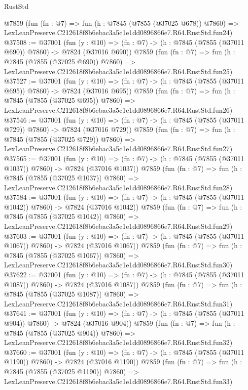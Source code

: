 \begin{lexlean}{RustStd}
\begin{coremodule}
    @7859
    (fun (fn : @7) =>
    fun (h : @7845 (@7855 (@37025 @678)) @7860) =>
    LexLeanPreserve.C212618f8b6ebac3a5c1e1dd0896866e7.R64.RustStd.fun24)
@37508 := @37001
    (fun (y : @10) => (fn : @7) -> (h : @7845 (@7855 (@37011 @690)) @7860) -> @7824 (@37016 @690))
    @7859
    (fun (fn : @7) =>
    fun (h : @7845 (@7855 (@37025 @690)) @7860) =>
    LexLeanPreserve.C212618f8b6ebac3a5c1e1dd0896866e7.R64.RustStd.fun25)
@37527 := @37001
    (fun (y : @10) => (fn : @7) -> (h : @7845 (@7855 (@37011 @695)) @7860) -> @7824 (@37016 @695))
    @7859
    (fun (fn : @7) =>
    fun (h : @7845 (@7855 (@37025 @695)) @7860) =>
    LexLeanPreserve.C212618f8b6ebac3a5c1e1dd0896866e7.R64.RustStd.fun26)
@37546 := @37001
    (fun (y : @10) => (fn : @7) -> (h : @7845 (@7855 (@37011 @729)) @7860) -> @7824 (@37016 @729))
    @7859
    (fun (fn : @7) =>
    fun (h : @7845 (@7855 (@37025 @729)) @7860) =>
    LexLeanPreserve.C212618f8b6ebac3a5c1e1dd0896866e7.R64.RustStd.fun27)
@37565 := @37001
    (fun (y : @10) => (fn : @7) -> (h : @7845 (@7855 (@37011 @1037)) @7860) -> @7824 (@37016 @1037))
    @7859
    (fun (fn : @7) =>
    fun (h : @7845 (@7855 (@37025 @1037)) @7860) =>
    LexLeanPreserve.C212618f8b6ebac3a5c1e1dd0896866e7.R64.RustStd.fun28)
@37584 := @37001
    (fun (y : @10) => (fn : @7) -> (h : @7845 (@7855 (@37011 @1042)) @7860) -> @7824 (@37016 @1042))
    @7859
    (fun (fn : @7) =>
    fun (h : @7845 (@7855 (@37025 @1042)) @7860) =>
    LexLeanPreserve.C212618f8b6ebac3a5c1e1dd0896866e7.R64.RustStd.fun29)
@37603 := @37001
    (fun (y : @10) => (fn : @7) -> (h : @7845 (@7855 (@37011 @1067)) @7860) -> @7824 (@37016 @1067))
    @7859
    (fun (fn : @7) =>
    fun (h : @7845 (@7855 (@37025 @1067)) @7860) =>
    LexLeanPreserve.C212618f8b6ebac3a5c1e1dd0896866e7.R64.RustStd.fun30)
@37622 := @37001
    (fun (y : @10) => (fn : @7) -> (h : @7845 (@7855 (@37011 @1087)) @7860) -> @7824 (@37016 @1087))
    @7859
    (fun (fn : @7) =>
    fun (h : @7845 (@7855 (@37025 @1087)) @7860) =>
    LexLeanPreserve.C212618f8b6ebac3a5c1e1dd0896866e7.R64.RustStd.fun31)
@37641 := @37001
    (fun (y : @10) => (fn : @7) -> (h : @7845 (@7855 (@37011 @904)) @7860) -> @7824 (@37016 @904))
    @7859
    (fun (fn : @7) =>
    fun (h : @7845 (@7855 (@37025 @904)) @7860) =>
    LexLeanPreserve.C212618f8b6ebac3a5c1e1dd0896866e7.R64.RustStd.fun32)
@37660 := @37001
    (fun (y : @10) => (fn : @7) -> (h : @7845 (@7855 (@37011 @1190)) @7860) -> @7824 (@37016 @1190))
    @7859
    (fun (fn : @7) =>
    fun (h : @7845 (@7855 (@37025 @1190)) @7860) =>
    LexLeanPreserve.C212618f8b6ebac3a5c1e1dd0896866e7.R64.RustStd.fun33)

\end{coremodule}
\end{lexlean}
